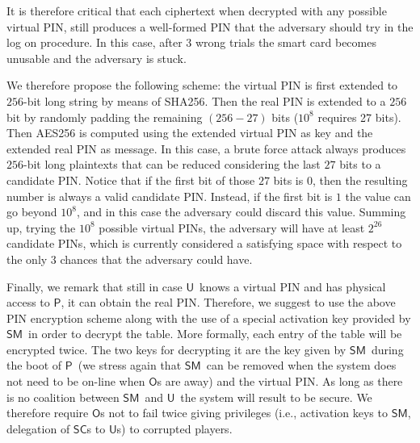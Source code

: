 \documentclass{sig-alternate}
\newcommand{\Owner}{\ensuremath{\mathsf{O}}}
\newcommand{\SM}{\ensuremath{\mathsf{SM}}}
\newcommand{\User}{\ensuremath{\mathsf{U}}}
\newcommand{\Proxy}{\ensuremath{\mathsf{P}}}
\newcommand{\SC}{\ensuremath{\mathsf{SC}}}
\begin{document}
It is therefore critical that each ciphertext when decrypted with any possible virtual PIN, still produces a well-formed PIN that the adversary should try in the log on procedure. In this case, after $3$ wrong trials the smart card becomes unusable and the adversary is stuck.

We therefore propose the following scheme: the virtual PIN is first extended to $256$-bit long string by means of SHA256. Then the real PIN is extended to a $256$ bit by randomly
padding the remaining $(256-27)$ bits ($10^8$ requires 27 bits). Then AES256 is computed using the extended virtual PIN as key and the extended real PIN as message.
In this case, a brute force attack always produces $256$-bit long plaintexts that can be reduced considering the last $27$ bits to a candidate PIN. Notice that if the first bit of those $27$ bits is
$0$, then the resulting number is always a valid candidate PIN. Instead, if the first bit is $1$ the value can go beyond $10^8$, and in this case the adversary could discard
this value. Summing up, trying the $10^8$ possible virtual PINs, the adversary will have at least $2^{26}$ candidate PINs, which is currently considered a satisfying
space with respect to the only $3$ chances that the adversary could have.

Finally, we remark that still in case \User\ knows a virtual PIN and has physical access to \Proxy, it can obtain the real PIN. Therefore, we suggest to use
the above PIN encryption scheme along with the use of a special activation key provided by \SM\, in order to decrypt the table. More formally, each entry
of the table will be encrypted twice. The two keys for decrypting it are the key given by \SM\ during the boot of \Proxy\ (we stress again that \SM\ can be removed when the system does
not need to be on-line when \Owner s are away) and the virtual PIN. As long as there is no coalition between \SM\ and \User\ the system will result
to be secure. We therefore require \Owner s not to fail twice giving privileges (i.e., activation keys to \SM, delegation of \SC s to \User s) to corrupted players.
\end{document}
